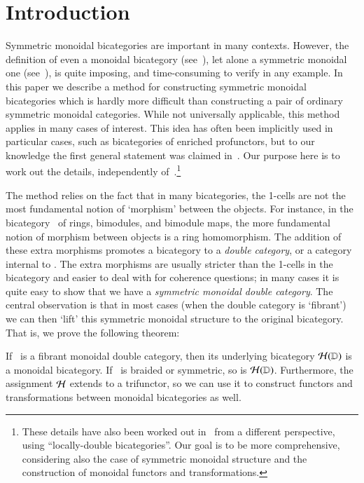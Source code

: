 \section{Introduction}
\label{sec:introduction}

Symmetric monoidal bicategories are important in many contexts.
However, the definition of even a monoidal bicategory
(see~\cite{gps:tricats,nick:tricats}), let alone a symmetric monoidal
one
(see~\cite{kv:2cat-zam,kv:bm2cat,bn:hda-i,ds:monbi-hopfagbd,crans:centers,mccrudden:bal-coalgb,gurski:brmonbicat}),
is quite imposing, and time-consuming to verify in any example.  In
this paper we describe a method for constructing symmetric monoidal
bicategories which is hardly more difficult than constructing a pair
of ordinary symmetric monoidal categories.  While not universally
applicable, this method applies in many cases of interest.  This idea
has often been implicitly used in particular cases, such as
bicategories of enriched profunctors, but to our knowledge the first
general statement was claimed in~\cite[Appendix B]{shulman:frbi}.  Our
purpose here is to work out the details, independently
of~\cite{shulman:frbi}.\footnote{These details have also been worked out
in~\cite[\S5]{gg:ldstr-tricat} from a different perspective, using
``locally-double bicategories''.  Our goal is to be more
comprehensive, considering also the case of symmetric monoidal
structure and the construction of monoidal functors and
transformations.}

The method relies on the fact that in many bicategories, the 1-cells
are not the most fundamental notion of `morphism' between the objects.
For instance, in the bicategory \cMod\ of rings, bimodules, and
bimodule maps, the more fundamental notion of morphism between objects
is a ring homomorphism. The addition of these extra morphisms promotes
a bicategory to a \emph{double category}, or a category internal to
\cCat.  The extra morphisms are usually stricter than the 1-cells in
the bicategory and easier to deal with for coherence questions; in
many cases it is quite easy to show that we have a \emph{symmetric
  monoidal double category}.  The central observation is that in most
cases (when the double category is `fibrant') we can then `lift' this
symmetric monoidal structure to the original bicategory.  That is, we
prove the following theorem:

\begin{thm}\label{thm:mondbl-monbi-intro}
  If \lD\ is a fibrant monoidal double category, then its underlying
  bicategory $\mathcal{H}(\mathbb{D})$ is a monoidal bicategory.  If \lD\ is braided
  or symmetric, so is $\mathcal{H}(\mathbb{D})$. Furthermore, the assignment $\mathcal{H}$
  extends to a trifunctor, so we can use it to construct functors and
  transformations between monoidal bicategories as well.
\end{thm}

